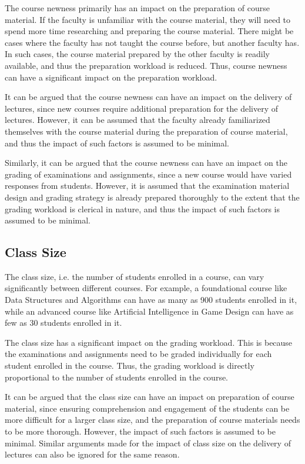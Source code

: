 The course newness primarily has an impact on the preparation of course material. If the faculty is unfamiliar with the course material, they will need to spend more time researching and preparing the course material. There might be cases where the faculty has not taught the course before, but another faculty has. In such cases, the course material prepared by the other faculty is readily available, and thus the preparation workload is reduced. Thus, course newness can have a significant impact on the preparation workload.

It can be argued that the course newness can have an impact on the delivery of lectures, since new courses require additional preparation for the delivery of lectures. However, it can be assumed that the faculty already familiarized themselves with the course material during the preparation of course material, and thus the impact of such factors is assumed to be minimal.

Similarly, it can be argued that the course newness can have an impact on the grading of examinations and assignments, since a new course would have varied responses from students. However, it is assumed that the examination material design and grading strategy is already prepared thoroughly to the extent that the grading workload is clerical in nature, and thus the impact of such factors is assumed to be minimal.

\subsection{Class Size}

The class size, i.e. the number of students enrolled in a course, can vary significantly between different courses. For example, a foundational course like Data Structures and Algorithms can have as many as 900 students enrolled in it, while an advanced course like Artificial Intelligence in Game Design can have as few as 30 students enrolled in it.

The class size has a significant impact on the grading workload. This is because the examinations and assignments need to be graded individually for each student enrolled in the course. Thus, the grading workload is directly proportional to the number of students enrolled in the course.

It can be argued that the class size can have an impact on preparation of course material, since ensuring comprehension and engagement of the students can be more difficult for a larger class size, and the preparation of course materials needs to be more thorough. However, the impact of such factors is assumed to be minimal. Similar arguments made for the impact of class size on the delivery of lectures can also be ignored for the same reason.


